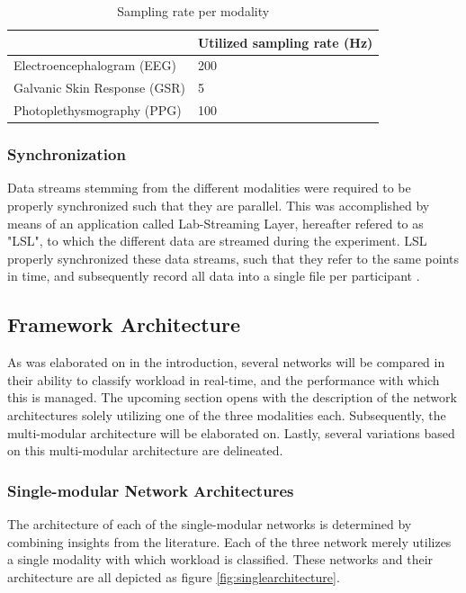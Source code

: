 \documentclass[12pt]{article}
\begin{document}
\bgroup
\def\arraystretch{1.6}%
\begin{table}[h]
\centering
\caption{Sampling rate per modality}
\label{table:samplingrate}
\begin{tabular}{ll}
    & Utilized sampling rate (Hz) \\ \hline
 Electroencephalogram (EEG) & 200                         \\
Galvanic Skin Response (GSR) & 5                           \\
Photoplethysmography (PPG) & 100                         \\ \hline
\end{tabular}
\end{table}
\egroup

\subsubsection{Synchronization}
Data streams stemming from the different modalities were required to be properly synchronized such that they are parallel. This was accomplished by means of an application called Lab-Streaming Layer, hereafter refered to as "LSL", to which the different data are streamed during the experiment. LSL properly synchronized these data streams, such that they refer to the same points in time, and subsequently record all data into a single file per participant \cite{kothe2018lab}.

\subsection{Framework Architecture}
As was elaborated on in the introduction, several networks will be compared in their ability to classify workload in real-time, and the performance with which this is managed. The upcoming section opens with the description of the network architectures solely utilizing one of the three modalities each. Subsequently, the multi-modular architecture will be elaborated on. Lastly, several variations based on this multi-modular architecture are delineated. 

\subsubsection{Single-modular Network Architectures}
The architecture of each of the single-modular networks is determined by combining insights from the literature. Each of the three network merely utilizes a single modality with which workload is classified. These networks and their architecture are all depicted as figure \ref{fig:singlearchitecture}.
\end{document}
